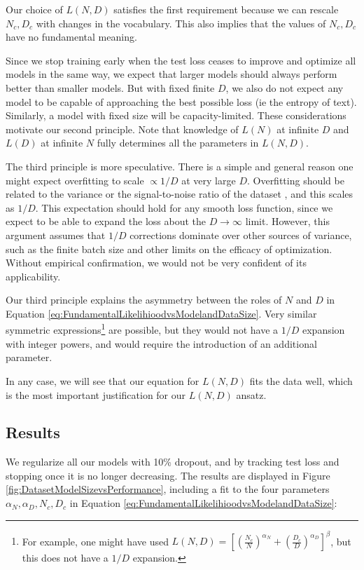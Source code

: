 \documentclass[english]{article}
\begin{document}
Our choice of $L(N,D)$ satisfies the first requirement because we can rescale $N_c, D_c$ with changes in the vocabulary.  This also implies that the values of $N_c, D_c$ have no fundamental meaning.

Since we stop training early when the test loss ceases to improve and optimize all models in the same way, we expect that larger models should always perform better than smaller models.  But with fixed finite $D$, we also do not expect any model to be capable of approaching the best possible loss (ie the entropy of text).  Similarly, a model with fixed size will be capacity-limited.  These considerations motivate our second principle.
Note that knowledge of $L(N)$ at infinite $D$ and $L(D)$ at infinite $N$ fully determines all the parameters in $L(N,D)$.

The third principle is more speculative.  There is a simple and general reason one might expect overfitting to scale $\propto 1/D$ at very large $D$.  Overfitting should be related to the variance or the signal-to-noise ratio of the dataset \cite{1710.03667}, and this scales as $1/D$.  This expectation should hold for any smooth loss function, since we expect to be able to expand the loss about the $D \to \infty$ limit.   However, this argument assumes that $1/D$ corrections dominate over other sources of variance, such as the finite batch size and  other limits on the efficacy of optimization.  Without empirical confirmation, we would not be very confident of its applicability.

Our third principle explains the asymmetry between the roles of $N$ and $D$ in Equation \eqref{eq:FundamentalLikelihioodvsModelandDataSize}.  Very similar symmetric expressions\footnote{For example, one might have used $L(N,D) =  \left[ \left( \frac{N_c}{N} \right)^{\alpha_N} + \left( \frac{D_c}{D} \right)^{\alpha_D}  \right]^\beta$, but this does not  have a $1/D$ expansion.} are possible, but they would not have a $1/D$ expansion with integer powers, and would require the introduction of an additional parameter.

In any case, we will see that our equation for $L(N,D)$ fits the data  well, which is the most important justification for our $L(N,D)$ ansatz.

\subsection{Results}

We regularize all our models with 10\% dropout, and by tracking test loss and stopping once it is no longer decreasing.   The results are displayed in Figure \ref{fig:DatasetModelSizevsPerformance}, including a fit to the four parameters $\alpha_N, \alpha_D, N_c, D_c$ in Equation \eqref{eq:FundamentalLikelihioodvsModelandDataSize}:
\end{document}
